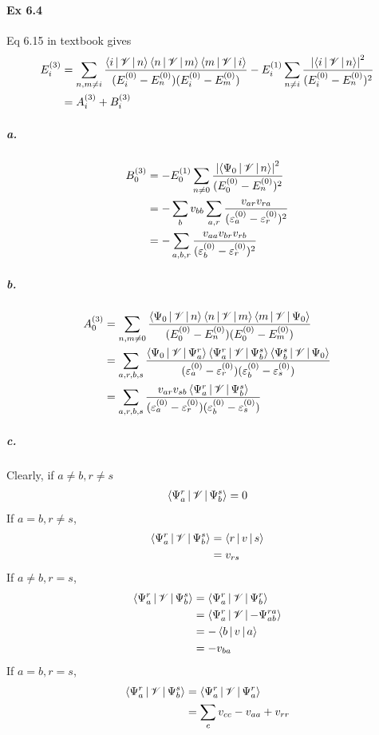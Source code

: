 \documentclass[a4paper]{article}
\newcommand{\ex}[1]{\paragraph{Ex #1}}
\newcommand{\subex}[1]{\subparagraph{#1}}
\numberwithin{equation}{subsection}
\begin{document}
\ex{6.4}
Eq 6.15 in textbook gives
\begin{align}
E_i^{(3)} &= \sum_{n,m\neq i} \dfrac{\Braket{i|\mathscr{V}|n} \Braket{n|\mathscr{V}|m} \Braket{m|\mathscr{V}|i}}{(E_i^{(0)}-E_n^{(0)}) (E_i^{(0)}-E_m^{(0)})} 
- E_i^{(1)}\sum_{n\neq i} \dfrac{\abs{\Braket{i|\mathscr{V}|n}}^2 }{(E_i^{(0)}-E_n^{(0)})^2} \notag\\
&= A_i^{(3)} + B_i^{(3)}
\end{align}
\subex{a.}
\begin{align}
B_0^{(3)} &= - E_0^{(1)}\sum_{n\neq 0} \dfrac{\abs{\Braket{\Psi_0|\mathscr{V}|n}}^2 }{(E_0^{(0)}-E_n^{(0)})^2} \notag\\
&= -\sum_b v_{bb} \sum_{a,r}\dfrac{v_{ar}v_{ra}}{(\varepsilon_a^{(0)} - \varepsilon_r^{(0)})^2} \notag\\
&= - \sum_{a,b,r}\dfrac{v_{aa} v_{br}v_{rb}}{(\varepsilon_b^{(0)} - \varepsilon_r^{(0)})^2} 
\end{align}
\subex{b.}
\begin{align}
A_0^{(3)} &= \sum_{n,m\neq 0} \dfrac{\Braket{\Psi_0|\mathscr{V}|n} \Braket{n|\mathscr{V}|m} \Braket{m|\mathscr{V}|\Psi_0}}{(E_0^{(0)}-E_n^{(0)}) (E_0^{(0)}-E_m^{(0)})} \notag\\
&= \sum_{a,r,b,s} \dfrac{\Braket{\Psi_0|\mathscr{V}|\Psi_a^r} \Braket{\Psi_a^r|\mathscr{V}|\Psi_b^s} \Braket{\Psi_b^s|\mathscr{V}|\Psi_0}}{(\varepsilon_a^{(0)} - \varepsilon_r^{(0)}) (\varepsilon_b^{(0)} - \varepsilon_s^{(0)})} \notag\\
&= \sum_{a,r,b,s} \dfrac{v_{ar}v_{sb} \Braket{\Psi_a^r|\mathscr{V}|\Psi_b^s} }{(\varepsilon_a^{(0)} - \varepsilon_r^{(0)}) (\varepsilon_b^{(0)} - \varepsilon_s^{(0)})} 
\end{align}
\subex{c.}
Clearly, if $ a\neq b, r\neq s $
\begin{align}
\Braket{\Psi_a^r | \mathscr{V} | \Psi_b^s} = 0
\end{align}
If $ a=b, r\neq s $,
\begin{align}
\Braket{\Psi_a^r | \mathscr{V} | \Psi_b^s} 
&= \Braket{r| v |s} \notag\\
&= v_{rs}
\end{align}
If $ a\neq b, r= s $,
\begin{align}
\Braket{\Psi_a^r | \mathscr{V} | \Psi_b^s} 
&= \Braket{\Psi_a^r | \mathscr{V} | \Psi_b^r} \notag\\
&= \Braket{\Psi_a^r | \mathscr{V} | -\Psi_{ab}^{ra}} \notag\\
&= -\Braket{b| v |a} \notag\\
&= -v_{ba}
\end{align}
If $ a= b, r= s $,
\begin{align}
\Braket{\Psi_a^r | \mathscr{V} | \Psi_b^s} 
&= \Braket{\Psi_a^r | \mathscr{V} | \Psi_a^r} \notag\\
&= \sum_c v_{cc} - v_{aa} + v_{rr}
\end{align}
\end{document}
